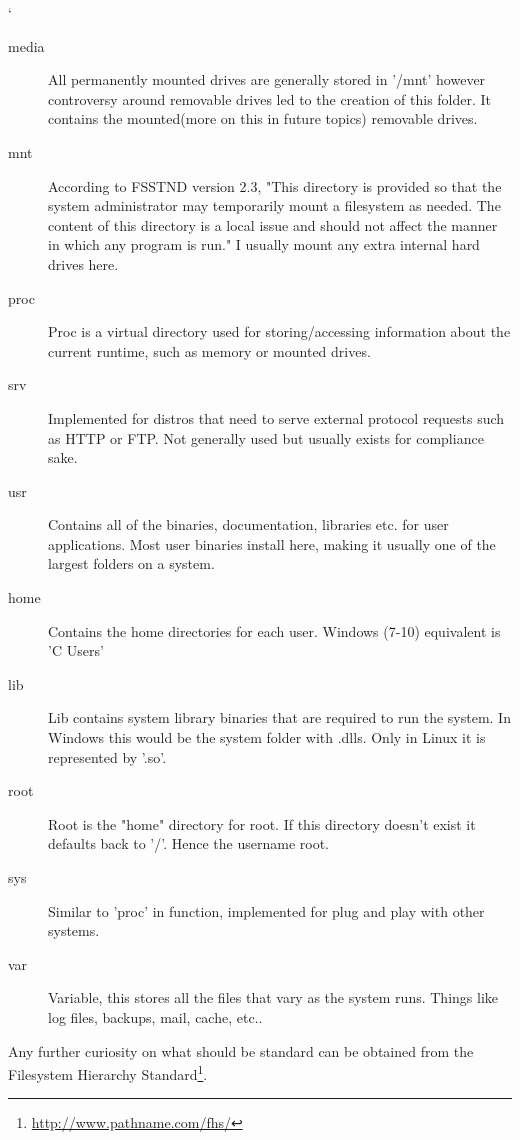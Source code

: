 `\documentclass[a4paper,11pt]{report}
\begin{document}
\begin{description}
\begin{description}
							\item[media]
								All permanently mounted drives are generally stored in '/mnt' however controversy around removable drives led to the creation of this folder.
								It contains the mounted(more on this in future topics) removable drives.
							\item[mnt]
								According to FSSTND version 2.3, "This directory is provided so that the system administrator may temporarily mount a filesystem as needed.
								The content of this directory is a local issue and should not affect the manner in which any program is run."
								I usually mount any extra internal hard drives here.
							\item[proc]
								Proc is a virtual directory used for storing/accessing information about the current runtime, such as memory or mounted drives.
							\item[srv]
								Implemented for distros that need to serve external protocol requests such as HTTP or FTP.
								Not generally used but usually exists for compliance sake.
							\item[usr]
								Contains all of the binaries, documentation, libraries etc. for user applications.
								Most user binaries install here, making it usually one of the largest folders on a system.
							\item[home]
								Contains the home directories for each user.
								Windows (7-10) equivalent is 'C Users'
							\item[lib]
								Lib contains system library binaries that are required to run the system.
								In Windows this would be the system folder with .dlls.
								Only in Linux it is represented by '.so'.
							\item[root]
								Root is the "home" directory for root.
								If this directory doesn’t exist it defaults back to '/'.
								Hence the username root.
							\item[sys]
								Similar to 'proc' in function, implemented for plug and play with other systems.
							\item[var]
								Variable, this stores all the files that vary as the system runs.
								Things like log files, backups, mail, cache, etc..
						\end{description}

						Any further curiosity on what should be standard can be obtained from the Filesystem Hierarchy Standard\footnote{\url{http://www.pathname.com/fhs/}}.


\end{description}
\end{document}
